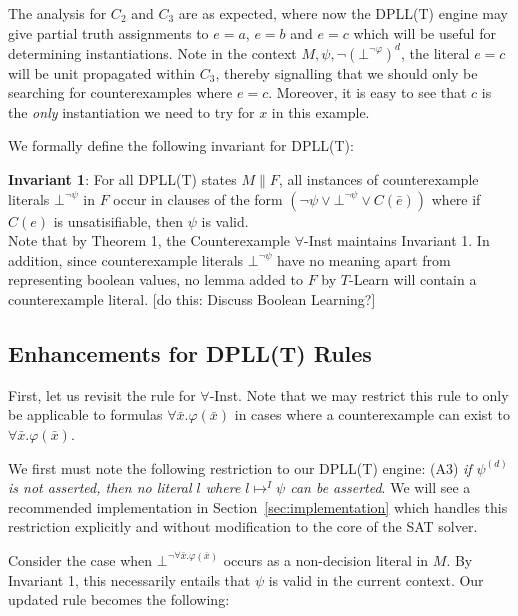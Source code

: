 \documentclass{llncs}
\begin{document}
The analysis for $C_2$ and $C_3$ are as expected, where now the DPLL(T) engine may give partial truth assignments to $e = a$, $e = b$ and $e = c$ which will be useful for determining instantiations.
Note in the context $M, \psi, \neg( \bot^{\neg \varphi} )^d$, the literal $e = c$ will be unit propagated within $C_3$, thereby signalling that we should only be searching for counterexamples where $e = c$.
Moreover, it is easy to see that $c$ is the \emph{only} instantiation we need to try for $x$ in this example.

We formally define the following invariant for DPLL(T):

{\bf Invariant 1}:
For all DPLL(T) states $M \parallel F$, all instances of counterexample literals $\bot^{\neg \psi}$ in $F$ occur in clauses of the form $( \neg \psi \vee \bot^{\neg \psi} \vee C(\bar{e}) )$ where if $C(e)$ is unsatisifiable, then $\psi$ is valid. \\

Note that by Theorem 1, the Counterexample $\forall$-Inst maintains Invariant 1.
In addition, since counterexample literals $\bot^{ \neg \psi }$ have no meaning apart from representing boolean values, no lemma added to $F$ by $T$-Learn will contain a counterexample literal.
[do this: Discuss Boolean Learning?]

\subsection{Enhancements for DPLL(T) Rules}

First, let us revisit the rule for $\forall$-Inst.
Note that we may restrict this rule to only be applicable to formulas $\forall \bar{x}. \varphi( \bar{ x } )$ in cases where a counterexample can exist to $\forall \bar{x}. \varphi( \bar{ x } )$.

We first must note the following restriction to our DPLL(T) engine: (A3) \emph{if $\psi^{(d)}$ is not asserted, then no literal $l$ where $l \mapsto^I \psi$ can be asserted}.
We will see a recommended implementation in Section~\ref{sec:implementation} which handles this restriction explicitly and without modification to the core of the SAT solver.

Consider the case when $\bot^{\neg \forall \bar{x}. \varphi( \bar{ x } )}$ occurs as a non-decision literal in $M$.
By Invariant 1, this necessarily entails that $\psi$ is valid in the current context.
Our updated rule becomes the following: \\
\end{document}
